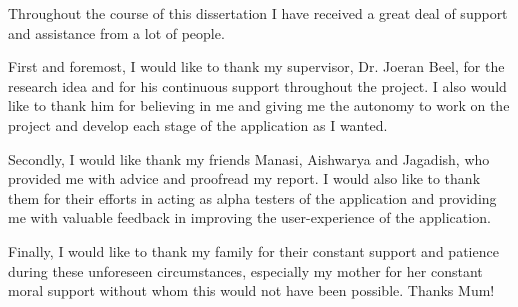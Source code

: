 Throughout the course of this dissertation I have received a great deal of support and assistance from a lot of people.

First and foremost, I would like to thank my supervisor, Dr. Joeran Beel, for the research idea and for his continuous support throughout the project. I also would like to thank him for believing in me and giving me the autonomy to work on the project and develop each stage of the application as I wanted.

Secondly, I would like thank my friends Manasi, Aishwarya and Jagadish, who provided me with advice and proofread my report. I would also like to thank them for their efforts in acting as alpha testers of the application and providing me with valuable feedback in improving the user-experience of the application.

Finally, I would like to thank my family for their constant support and patience during these unforeseen circumstances, especially my mother for her constant moral support without whom this would not have been possible. Thanks Mum!